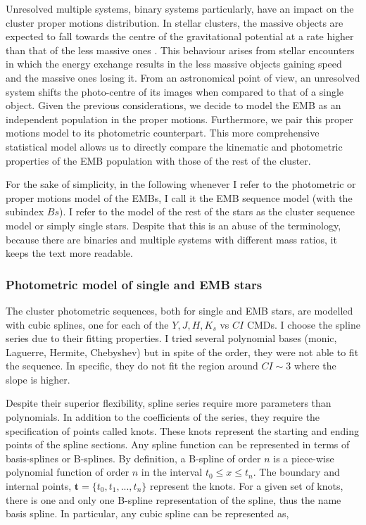 Unresolved multiple systems, binary systems particularly, have an impact on the cluster proper motions distribution. In stellar clusters, the massive objects are expected to fall towards the centre of the gravitational potential at a rate higher than that of the less massive ones \citep{Binney?}. This behaviour arises from stellar encounters in which the energy exchange results in the less massive objects gaining speed and the massive ones losing it. From an astronomical point of view, an unresolved system shifts the photo-centre of its images when compared to that of a single object. Given the previous considerations, we decide to model the EMB as an independent population in the proper motions. Furthermore, we pair this proper motions model to its photometric counterpart. This more comprehensive statistical model allows us to directly compare the kinematic and photometric properties of the EMB population with those of the rest of the cluster. 

For the sake of simplicity, in the following whenever I refer to the photometric or proper motions model of the EMBs, I call it the EMB sequence model (with the subindex $Bs$). I refer to the model of the rest of the stars as the cluster sequence model or simply single stars. Despite that this is an abuse of the terminology, because there are binaries and multiple systems with different mass ratios, it keeps the text more readable.

\subsubsection{Photometric model of single and EMB stars}

The cluster photometric sequences, both for single and EMB stars, are modelled with cubic splines, one for each of the $Y,J,H,K_s$ vs $CI$ CMDs. I choose the spline series due to their fitting properties. I tried several polynomial bases (monic, Laguerre, Hermite, Chebyshev) but in spite of the order, they were not able to fit the sequence. In specific, they do not fit the region around $CI \sim 3$ where the slope is higher. 

{\color{blue}
Despite their superior flexibility, spline series require more parameters than polynomials. In addition to the coefficients of the series, they require the specification of points called knots. These knots represent the starting and ending points of the spline sections. 
}
Any spline function can be represented in terms of basis-splines or B-splines. By definition, a B-spline of order $n$ is a piece-wise polynomial function of order $n$ in the interval $t_0 \leq x \leq t_n$. The boundary and internal points, $\mathbf{t}=\{t_0,t_1,...,t_n\}$ represent the knots. For a given set of knots, there is one and only one B-spline representation of the spline, thus the name basis spline.  In particular, any cubic spline can be represented as,

